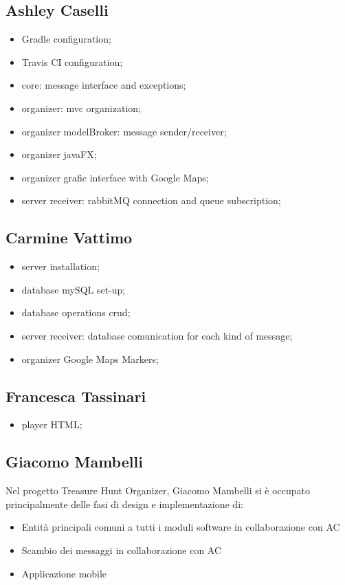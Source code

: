 \documentclass[12pt, italian]{article}
\begin{document}
\subsection{Ashley Caselli}
\begin{itemize}
	\item Gradle configuration;
	\item Travis CI configuration;
	\item core: message interface and exceptions;
	\item organizer: mvc organization;
	\item organizer modelBroker: message sender/receiver;
	\item organizer javaFX;
	\item organizer grafic interface with Google Maps;
	\item server receiver: rabbitMQ connection and queue subscription;
\end{itemize}
\subsection{Carmine Vattimo}
\begin{itemize}
	\item server installation;
	\item database mySQL set-up;
	\item database operations crud;
	\item server receiver: database comunication for each kind of message;
	\item organizer Google Maps Markers;
\end{itemize}
\subsection{Francesca Tassinari}
\begin{itemize}
	\item player HTML;
\end{itemize}
\subsection{Giacomo Mambelli}
Nel progetto Treasure Hunt Organizer, Giacomo Mambelli si è occupato principalmente delle fasi di design e implementazione di:
\begin{itemize}
	\item Entità principali comuni a tutti i moduli software in collaborazione con AC
	\item Scambio dei messaggi in collaborazione con AC
	\item Applicazione mobile
\end{itemize}
\end{document}

